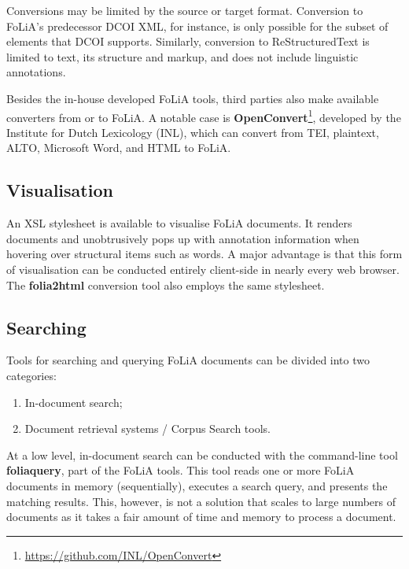 \documentclass[a4paper,11pt]{article}
\begin{document}
Conversions may be limited by the source or target format. Conversion to
FoLiA's predecessor DCOI XML, for instance, is only possible for the subset of
elements that DCOI supports. Similarly, conversion to
ReStructuredText is limited
to text, its structure and markup, and does not include linguistic annotations.

Besides the in-house developed FoLiA tools, third parties also make available
converters from or to FoLiA. A notable case is
\textbf{OpenConvert}\footnote{\url{https://github.com/INL/OpenConvert}},
developed by the Institute for Dutch Lexicology (INL), which can convert from
TEI, plaintext, ALTO, Microsoft Word, and HTML to FoLiA.

\subsection{Visualisation}

An XSL stylesheet is available to visualise FoLiA documents. It renders
documents and unobtrusively pops up with annotation information when hovering
over structural items such as words. A major advantage is that this form of
visualisation can be conducted entirely client-side in nearly every
web browser. The \textbf{folia2html} conversion tool also employs the same
stylesheet.

\subsection{Searching}

Tools for searching and querying FoLiA documents can be divided into two
categories:

\begin{enumerate}
 \item In-document search;
 \item Document retrieval systems / Corpus Search tools.
\end{enumerate}

At a low level, in-document search can be conducted with the command-line tool
\textbf{foliaquery}, part of the FoLiA tools. This tool reads one or more FoLiA
documents in memory (sequentially), executes a search query, and presents the
matching results. This, however, is not a solution that scales to large
numbers of documents as it takes a fair amount of time and memory to process a document.
\end{document}
